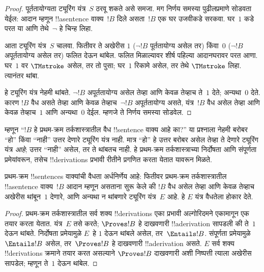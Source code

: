 \documentclass[../../../include/open-logic-section]{subfiles}
\begin{document}
\begin{proof}
  पूर्ततायोग्यता ट्यूरिंग यंत्र~$S$
  ठरवू शकते असे समजा. मग
  निर्णय समस्या पुढीलप्रमाणे
  सोडवता येईल: आदान म्हणून
  !!a{sentence} वाक्य~$!B$ दिले
  असता~$!B$ एक घर उजवीकडे
  सरकवा. घर~$1$ कडे परत
  या आणि तेथे~$\lnot$
  हे चिन्ह लिहा.

  आता ट्यूरिंग यंत्र~$S$
  चालवा. फितीवर ते अखेरीस
  $1$ ($\lnot !B$ पूर्ततायोग्य
  असेल तर) किंवा~$0$
  ($\lnot !B$ अपूर्ततायोग्य
  असेल तर) फलित देऊन
  थांबेल. फलित मिळाल्यावर शीर्ष पहिल्या
  आदानघरावर परत आणा. घर~$1$ वर
  $\TMstroke$ असेल, तर
  तो पुसा; घर~$1$
  रिकामे असेल, तर तेथे
  $\TMstroke$ लिहा.
  त्यानंतर थांबा.

  हे ट्यूरिंग यंत्र नेहमी
  थांबते. $\lnot
  !B$ अपूर्ततायोग्य असेल
  तेव्हा आणि केवळ तेव्हाच ते~$1$ देते;
  अन्यथा~$0$ देते.
  कारण $!B$ वैध असते
  तेव्हा आणि केवळ तेव्हाच~$\lnot !B$
  अपूर्ततायोग्य असते,
  यंत्र~$!B$ वैध असेल
  तेव्हा आणि केवळ तेव्हाच~$1$ आणि
  अन्यथा~$0$ देईल.
  म्हणजे ते निर्णय
  समस्या सोडवेल.
\end{proof}

\begin{explain}
म्हणून “$!B$ हे प्रथम-क्रम
तर्कशास्त्रातील वैध !!{sentence}
वाक्य आहे का?” या प्रश्नाला
नेहमी बरोबर “हो” किंवा
“नाही” उत्तर देणारे
ट्यूरिंग यंत्र नाही. मात्र
“हो” हे उत्तर बरोबर असेल
तेव्हा ते देणारे ट्यूरिंग
यंत्र \emph{आहे}; उत्तर
“नाही” असेल, तर ते
थांबतच नाही. हे प्रथम-क्रम
तर्कशास्त्राच्या निर्दोषता आणि
संपूर्णता प्रमेयांवरून, तसेच
!!{derivation}s प्रभावी
रीतीने प्रगणित करता येतात
यावरून मिळते.
\end{explain}

\begin{thm}
  प्रथम-क्रम !!{sentence}s
  वाक्यांची वैधता अर्धनिर्णेय आहे:
  फितीवर प्रथम-क्रम
  तर्कशास्त्रातील !!a{sentence}
  वाक्य~$!B$ आदान म्हणून
  असताना सुरू केले की
  $!B$ वैध असेल तेव्हा आणि केवळ तेव्हाच
  अखेरीस थांबून~$1$
  देणारे, आणि अन्यथा
  न थांबणारे ट्यूरिंग
  यंत्र~$E$ आहे. हे $E$
  यंत्र वैधतेला होकार देते.
\end{thm}

\begin{proof}
  प्रथम-क्रम तर्कशास्त्रातील
  सर्व शक्य !!{derivation}s
  एका प्रभावी अल्गोरिदमने
  एकामागून एक तयार करता
  येतात. यंत्र~$E$ तसे
  करते; $\Proves
  !B$ हे दाखवणारी
  !!a{derivation}
  सापडली की ते~$1$
  देऊन थांबते. निर्दोषता
  प्रमेयामुळे $E$~हे $1$
  देऊन थांबले असेल,
  तर~$\Entails !B$.
  संपूर्णता प्रमेयामुळे
  $\Entails !B$ असेल,
  तर~$\Proves !B$
  हे दाखवणारी !!a{derivation} असते. $E$
  सर्व शक्य !!{derivation}s
  क्रमाने तयार करत असल्याने
  $\Proves !B$ दाखवणारी
  अशी निष्पत्ती त्याला
  अखेरीस सापडेल; म्हणून
  ते~$1$ देऊन थांबेल.
\end{proof}
\end{document}
